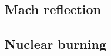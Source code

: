 \documentclass[]{article}
\begin{document}
    \subsection*{Mach reflection}

    \subsection*{Nuclear burning}


\end{document}
